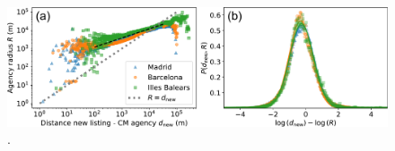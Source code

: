 \begin{figure}
    \label{fig:distance_attach}
    \centering
    \includegraphics[width =\textwidth]{Figs/Idealista_dynamics/distance_attach.pdf}
	\caption[.]{ . }
\end{figure}













